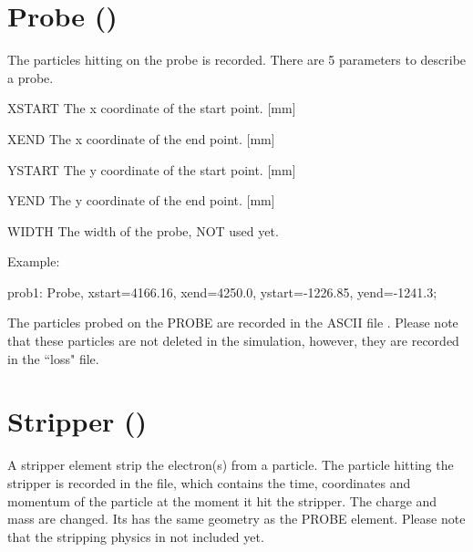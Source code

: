 \section{Probe (\opalcycl)}
The particles hitting on the probe is recorded. There are 5 parameters to describe a probe.
\begin{kdescription}
\item[XSTART]
The x coordinate of the start point. [\si{\milli\meter}]
 \item[XEND]
The x coordinate of the end point. [\si{\milli\meter}]
\item[YSTART]
The y coordinate of the start point. [\si{\milli\meter}]
 \item[YEND]
The y coordinate of the end point. [\si{\milli\meter}]
\item[WIDTH]
 The width of the probe, NOT used yet.
\end{kdescription}


\noindent Example:
\begin{example}
prob1: Probe, xstart=4166.16, xend=4250.0,
ystart=-1226.85, yend=-1241.3;
\end{example}
The particles probed on the PROBE are recorded in the ASCII file .
Please note that  these particles are not deleted in the simulation, however, they are recorded in the ``loss" file.


\clearpage
\section{Stripper (\opalcycl)}
A stripper element strip the electron(s) from a particle. The particle hitting the stripper is recorded in the file,
which contains the time, coordinates and momentum of the particle at the moment it hit the stripper.
The charge and mass are changed. Its has the same geometry as the PROBE element.
Please note that the stripping physics in not included yet.

